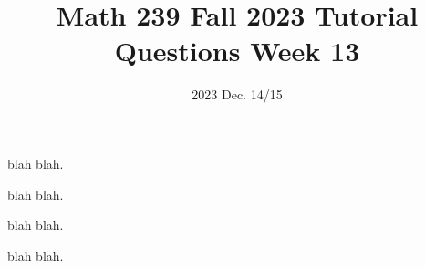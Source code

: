 \title{Math 239 Fall 2023 Tutorial Questions Week 13}

\date{2023 Dec. 14/15}
\maketitle

\begin{enumerate}
     blah blah.

    
     blah blah.

    
     blah blah.

    
     blah blah.
\end{enumerate}